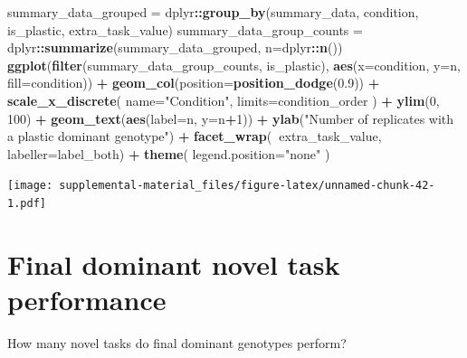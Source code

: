 \documentclass[]{book}
\newenvironment{Shaded}{\begin{snugshade}}{\end{snugshade}}
\newcommand{\DataTypeTok}[1]{\textcolor[rgb]{0.13,0.29,0.53}{#1}}
\newcommand{\DecValTok}[1]{\textcolor[rgb]{0.00,0.00,0.81}{#1}}
\newcommand{\FloatTok}[1]{\textcolor[rgb]{0.00,0.00,0.81}{#1}}
\newcommand{\KeywordTok}[1]{\textcolor[rgb]{0.13,0.29,0.53}{\textbf{#1}}}
\newcommand{\NormalTok}[1]{#1}
\newcommand{\OperatorTok}[1]{\textcolor[rgb]{0.81,0.36,0.00}{\textbf{#1}}}
\newcommand{\StringTok}[1]{\textcolor[rgb]{0.31,0.60,0.02}{#1}}
\begin{document}
\begin{Shaded}
\begin{Highlighting}[]
\NormalTok{summary_data_grouped =}\StringTok{ }\NormalTok{dplyr}\OperatorTok{::}\KeywordTok{group_by}\NormalTok{(summary_data, condition, is_plastic, extra_task_value)}
\NormalTok{summary_data_group_counts =}\StringTok{ }\NormalTok{dplyr}\OperatorTok{::}\KeywordTok{summarize}\NormalTok{(summary_data_grouped, }\DataTypeTok{n=}\NormalTok{dplyr}\OperatorTok{::}\KeywordTok{n}\NormalTok{())}
\KeywordTok{ggplot}\NormalTok{(}\KeywordTok{filter}\NormalTok{(summary_data_group_counts, is_plastic), }\KeywordTok{aes}\NormalTok{(}\DataTypeTok{x=}\NormalTok{condition, }\DataTypeTok{y=}\NormalTok{n, }\DataTypeTok{fill=}\NormalTok{condition)) }\OperatorTok{+}
\StringTok{  }\KeywordTok{geom_col}\NormalTok{(}\DataTypeTok{position=}\KeywordTok{position_dodge}\NormalTok{(}\FloatTok{0.9}\NormalTok{)) }\OperatorTok{+}
\StringTok{  }\KeywordTok{scale_x_discrete}\NormalTok{(}
    \DataTypeTok{name=}\StringTok{"Condition"}\NormalTok{,}
    \DataTypeTok{limits=}\NormalTok{condition_order}
\NormalTok{  ) }\OperatorTok{+}
\StringTok{  }\KeywordTok{ylim}\NormalTok{(}\DecValTok{0}\NormalTok{, }\DecValTok{100}\NormalTok{) }\OperatorTok{+}
\StringTok{  }\KeywordTok{geom_text}\NormalTok{(}\KeywordTok{aes}\NormalTok{(}\DataTypeTok{label=}\NormalTok{n, }\DataTypeTok{y=}\NormalTok{n}\OperatorTok{+}\DecValTok{1}\NormalTok{)) }\OperatorTok{+}
\StringTok{  }\KeywordTok{ylab}\NormalTok{(}\StringTok{"Number of replicates with a plastic dominant genotype"}\NormalTok{) }\OperatorTok{+}
\StringTok{  }\KeywordTok{facet_wrap}\NormalTok{(}\OperatorTok{~}\NormalTok{extra_task_value, }\DataTypeTok{labeller=}\NormalTok{label_both) }\OperatorTok{+}
\StringTok{  }\KeywordTok{theme}\NormalTok{(}
    \DataTypeTok{legend.position=}\StringTok{"none"}
\NormalTok{  )}
\end{Highlighting}
\end{Shaded}

\texttt{[image: supplemental-material\_files/figure-latex/unnamed-chunk-42-1.pdf]}

\hypertarget{final-dominant-novel-task-performance}{%
\section{Final dominant novel task performance}\label{final-dominant-novel-task-performance}}

How many novel tasks do final dominant genotypes perform?
\end{document}

